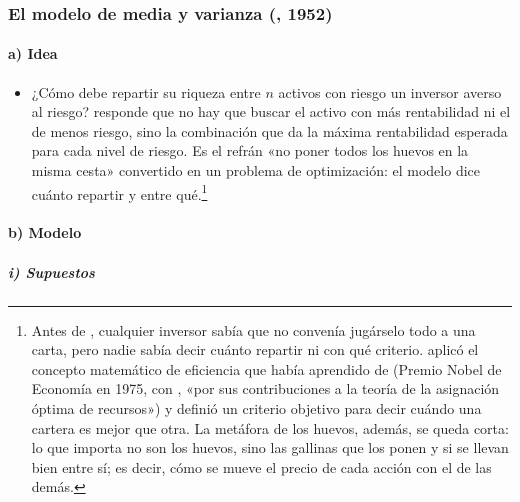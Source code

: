 \documentclass[11pt]{article}
\begin{document}
\subsubsection{El modelo de media y varianza (, 1952)}\label{sec:markowitz}

\paragraph{a) Idea}

\begin{itemize}
\item ¿Cómo debe repartir su riqueza entre $n$ activos con riesgo un inversor averso al riesgo? \textcite{Markowitz1952Portfolio} responde que no hay que buscar el activo con más rentabilidad ni el de menos riesgo, sino la combinación que da la máxima rentabilidad esperada para cada nivel de riesgo. Es el refrán «no poner todos los huevos en la misma cesta» convertido en un problema de optimización: el modelo dice cuánto repartir y entre qué.\footnote{Antes de , cualquier inversor sabía que no convenía jugárselo todo a una carta, pero nadie sabía decir cuánto repartir ni con qué criterio.  aplicó el concepto matemático de eficiencia que había aprendido de  (Premio Nobel de Economía en 1975, con , «por sus contribuciones a la teoría de la asignación óptima de recursos»\nocite{NobelPrize1975Koopmans}) y definió un criterio objetivo para decir cuándo una cartera es mejor que otra. La metáfora de los huevos, además, se queda corta: lo que importa no son los huevos, sino las gallinas que los ponen y si se llevan bien entre sí; es decir, cómo se mueve el precio de cada acción con el de las demás\nocite{PenalvaRubio2023Markowitz}.}
\end{itemize}

\paragraph{b) Modelo}

\subparagraph{i) Supuestos}
\end{document}
